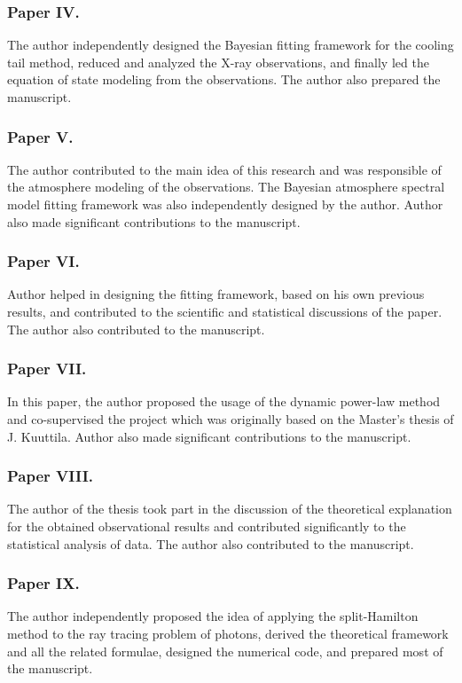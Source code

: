 \subsubsection*{Paper IV.}
The author independently designed the Bayesian fitting framework for the cooling tail method, reduced and analyzed the X-ray observations, and finally led the equation of state modeling from the observations. 
The author also prepared the manuscript.


\subsubsection*{Paper V.}
The author contributed to the main idea of this research and was responsible of the atmosphere modeling of the observations. The Bayesian atmosphere spectral model fitting framework was also independently designed by the author. 
Author also made significant contributions to the manuscript.


\subsubsection*{Paper VI.}
Author helped in designing the fitting framework, based on his own previous results, and contributed to the scientific and statistical discussions of the paper. 
The author also contributed to the manuscript.


\subsubsection*{Paper VII.}
In this paper, the author proposed the usage of the dynamic power-law method and co-supervised the project which was originally based on the Master's thesis of J. Kuuttila. 
Author also made significant contributions to the manuscript.


\subsubsection*{Paper VIII.}
The author of the thesis took part in the discussion of the theoretical explanation for the obtained observational results and contributed significantly to the statistical analysis of data. 
The author also contributed to the manuscript.


\subsubsection*{Paper IX.}
The author independently proposed the idea of applying the split-Hamilton method to the ray tracing problem of photons, derived the theoretical framework and all the related formulae, designed the numerical code, and prepared most of the manuscript.


